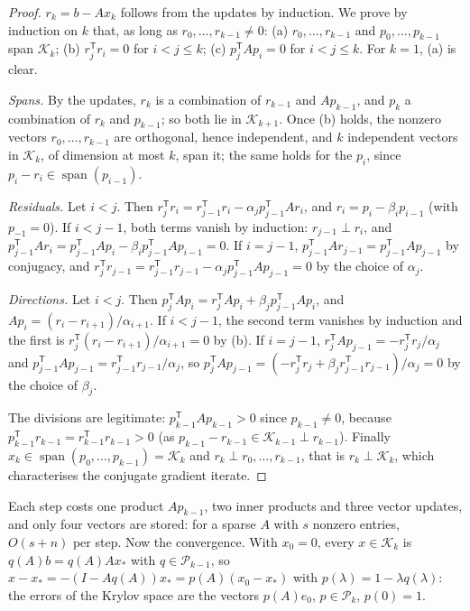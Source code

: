 \begin{proof}
$r_k=b-Ax_k$ follows from the updates by induction. We prove by induction on $k$ that, as long as $r_0,\dots,r_{k-1}\ne0$: (a) $r_0,\dots,r_{k-1}$ and
$p_0,\dots,p_{k-1}$ span $\mathcal K_k$; (b) $r_j^{\mathsf T}r_i=0$ for $i<j\le k$; (c) $p_j^{\mathsf T}Ap_i=0$ for $i<j\le k$. For $k=1$, (a) is clear.

\emph{Spans.} By the updates, $r_k$ is a combination of $r_{k-1}$ and $Ap_{k-1}$, and $p_k$ a combination of $r_k$ and $p_{k-1}$; so both lie in $\mathcal K_{k+1}$. Once (b) holds, the
nonzero vectors $r_0,\dots,r_{k-1}$ are orthogonal, hence independent, and $k$ independent vectors in $\mathcal K_k$, of dimension at most $k$, span it; the same
holds for the $p_i$, since $p_i-r_i\in\operatorname{span}(p_{i-1})$.

\emph{Residuals.} Let $i<j$. Then $r_j^{\mathsf T}r_i=r_{j-1}^{\mathsf T}r_i-\alpha_jp_{j-1}^{\mathsf T}Ar_i$, and $r_i=p_i-\beta_ip_{i-1}$ (with $p_{-1}=0$). If $i<j-1$, both terms
vanish by induction: $r_{j-1}\perp r_i$, and $p_{j-1}^{\mathsf T}Ar_i=p_{j-1}^{\mathsf T}Ap_i-\beta_ip_{j-1}^{\mathsf T}Ap_{i-1}=0$. If $i=j-1$,
$p_{j-1}^{\mathsf T}Ar_{j-1}=p_{j-1}^{\mathsf T}Ap_{j-1}$ by conjugacy, and $r_j^{\mathsf T}r_{j-1}=r_{j-1}^{\mathsf T}r_{j-1}-\alpha_jp_{j-1}^{\mathsf T}Ap_{j-1}=0$ by the choice of $\alpha_j$.

\emph{Directions.} Let $i<j$. Then $p_j^{\mathsf T}Ap_i=r_j^{\mathsf T}Ap_i+\beta_jp_{j-1}^{\mathsf T}Ap_i$, and $Ap_i=(r_i-r_{i+1})/\alpha_{i+1}$. If $i<j-1$, the second term vanishes by
induction and the first is $r_j^{\mathsf T}(r_i-r_{i+1})/\alpha_{i+1}=0$ by (b). If $i=j-1$, $r_j^{\mathsf T}Ap_{j-1}=-r_j^{\mathsf T}r_j/\alpha_j$ and
$p_{j-1}^{\mathsf T}Ap_{j-1}=r_{j-1}^{\mathsf T}r_{j-1}/\alpha_j$, so $p_j^{\mathsf T}Ap_{j-1}=(-r_j^{\mathsf T}r_j+\beta_jr_{j-1}^{\mathsf T}r_{j-1})/\alpha_j=0$ by the choice of $\beta_j$.

The divisions are legitimate: $p_{k-1}^{\mathsf T}Ap_{k-1}>0$ since $p_{k-1}\ne0$, because $p_{k-1}^{\mathsf T}r_{k-1}=r_{k-1}^{\mathsf T}r_{k-1}>0$ (as $p_{k-1}-r_{k-1}\in\mathcal K_{k-1}\perp r_{k-1}$).
Finally $x_k\in\operatorname{span}(p_0,\dots,p_{k-1})=\mathcal K_k$ and $r_k\perp r_0,\dots,r_{k-1}$, that is $r_k\perp\mathcal K_k$, which characterises the conjugate gradient iterate.
\end{proof}

Each step costs one product $Ap_{k-1}$, two inner products and three vector updates, and only four vectors are stored: for a sparse $A$ with $s$ nonzero
entries, $O(s+n)$ per step. Now the convergence. With $x_0=0$, every $x\in\mathcal K_k$ is $q(A)b=q(A)Ax_*$ with $q\in\mathcal P_{k-1}$, so
$x-x_*=-(I-Aq(A))x_*=p(A)(x_0-x_*)$ with $p(\lambda)=1-\lambda q(\lambda)$: the errors of the Krylov space are the vectors $p(A)e_0$, $p\in\mathcal P_k$, $p(0)=1$.

